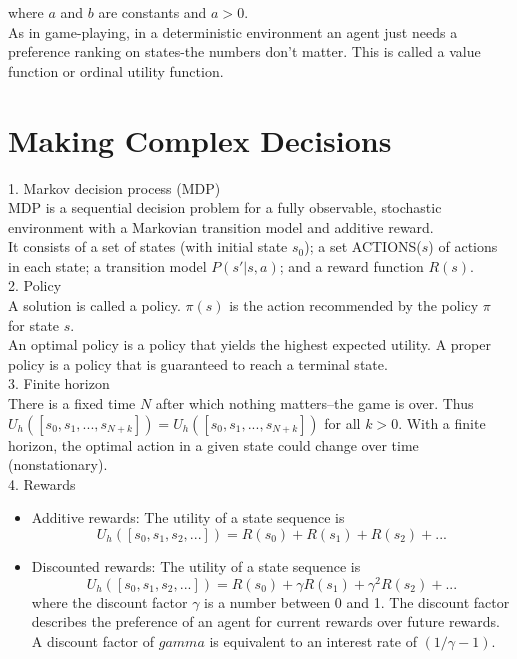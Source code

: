 \documentclass[12pt]{article}
\begin{document}
where $a$ and $b$ are constants and $a>0$. \\

As in game-playing, in a deterministic environment an agent just needs a preference ranking on states-the numbers don't matter. This is called a value function or ordinal utility function.

\section{Making Complex Decisions}

1. Markov decision process (MDP) \\

MDP is a sequential decision problem for a fully observable, stochastic environment with a Markovian transition model and additive reward. \\

It consists of a set of states (with initial state $s_0$); a set ACTIONS($s$) of actions in each state; a transition model $P(s'| s, a)$; and a reward function $R(s)$. \\

2. Policy \\

A solution is called a policy. $\pi(s)$ is the action recommended by the policy $\pi$ for state $s$. \\

An optimal policy is a policy that yields the highest expected utility. A proper policy is a policy that is guaranteed to reach a terminal state. \\

3. Finite horizon \\

There is a fixed time $N$ after which nothing matters--the game is over. Thus $U_h([s_0, s_1,...,s_{N+k}]) = U_h([s_0, s_1,...,s_{N+k}])$ for all $k>0$.  With a finite horizon, the optimal action in a given state could change over time (nonstationary). \\

4. Rewards
\begin{itemize}
\item Additive rewards: The utility of a state sequence is
  \begin{equation*}
    U_h([s_0,s_1,s_2,...]) = R(s_0)+R(s_1)+R(s_2)+...
  \end{equation*}
\item Discounted rewards: The utility of a state sequence is
  \begin{equation*}
    U_h([s_0,s_1,s_2,...])
    = R(s_0) + \gamma R(s_1) + \gamma^2 R(s_2)+...
  \end{equation*}
  where the discount factor $\gamma$ is a number between 0 and 1. The discount factor describes the preference of an agent for current rewards over future rewards. A discount factor of $gamma$ is equivalent to an interest rate of $(1 / \gamma -1)$.
\end{itemize}
\end{document}
